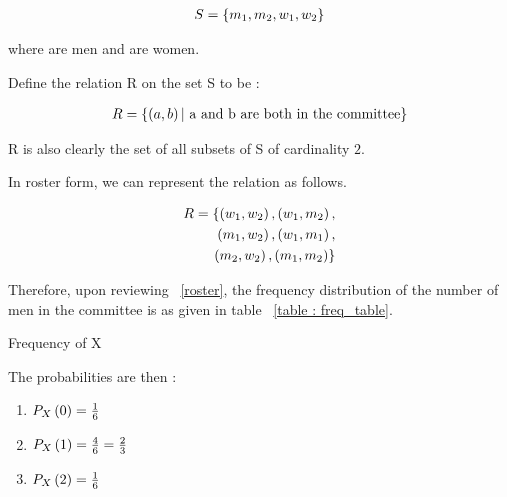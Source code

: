 \documentclass[journal,12pt,twocolumn]{IEEEtran}
\begin{document}
	\begin{align}
		S = \left\{m_1, m_2, w_1, w_2\right\}
		 	\label{sample}
	\end{align}
	
	where  are men and  are women.
	
	
	Define the relation R on the set S to be :
	
	\begin{align}
		R = \left\{\left(a, b\right) | \text{ a and b are both in the committee}\right\}
			\label{relation}
	\end{align}
	
	R is also clearly the set of all subsets of S  of cardinality $2$.

	In roster form, we can represent the relation  as follows.
	
	
	\begin{align}
		R = \{\left(w_1, w_2\right), \left(w_1, m_2\right), \nonumber 
			\\
			\left(m_1, w_2\right), \left(w_1, m_1\right), \nonumber 
			\\
			\left(m_2, w_2\right), \left(m_1, m_2\right)\}
				\label{roster}
	\end{align}
		
	Therefore, upon reviewing ~\eqref{roster}, the frequency distribution of the number of men in the committee  is as given in table ~\ref{table : freq_table}.
	
	\begin{table}[h!t]
	
		\centering
		
		\caption{Frequency of X}
		
		
		
		\label{table : freq_table}
		
	\end{table}
	
	
	The probabilities are then :
	
	\begin{enumerate}[label = \brak{\textbf{\roman*}}]

	\item $P_{X}\left(0\right) = \frac{1}{6}$
	
	\item $P_{X}\left(1\right) = \frac{4}{6} = \frac{2}{3}$
	
	\item $P_{X}\left(2\right) = \frac{1}{6}$
	
	\end{enumerate}
	
\end{document}
